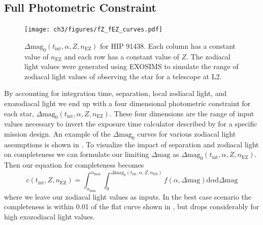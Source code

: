 
\subsection{Full Photometric Constraint}
\label{sub:full_comp}
\begin{figure}
  \begin{center}
    \texttt{[image: ch3/figures/fZ\_fEZ\_curves.pdf]}
  \end{center}
  \caption{$\Delta\textrm{mag}_0(t_\textrm{int}, \alpha, Z, n_\textrm{EZ})$ for HIP 91438.
    Each column has a constant value of $n_\textrm{EZ}$ and each row has a
    constant value of $Z$. The zodiacal light values were generated
    using EXOSIMS to simulate the range of zodiacal light values of observing
  the star for a telescope at L2.}
  \label{fig:fZ_fEZ_curves}
\end{figure}

By accounting for integration time, separation, local zodiacal light, and 
exozodiacal light we end up with a four dimensional photometric constraint for
each star, $\Delta\textrm{mag}_0(t_\textrm{int}, \alpha, Z,
n_\textrm{EZ})$. These four dimensions are the range of input values necessary
to invert the exposure time calculator described by \citet{Nemati2014} for a
specific mission design. An example of the $\Delta\textrm{mag}_0$ curves for
various zodiacal light assumptions is shown in . 
To visualize the impact of separation and zodiacal light on completeness
we can formulate our limiting $\Delta\textrm{mag}$ as 
$\Delta\textrm{mag}_0(t_\textrm{int}, \alpha, Z, n_\textrm{EZ})$.
Then our equation for completeness becomes
\begin{equation}
  c(t_\textrm{int}, Z, n_\textrm{EZ}) = 
  \int_{\alpha_\textrm{min}}^{\alpha_\textrm{max}} 
  \int_{0}^{\Delta\textrm{mag}_0(t_\textrm{int}, \alpha, Z, n_\textrm{EZ})}
  f(\alpha, \Delta\textrm{mag})\textrm{d}\alpha \textrm{d}\Delta\textrm{mag}
  \label{eq:comp_integral}
\end{equation}
where we leave our zodiacal light values as inputs. In the best case scenario
the completeness is within 0.01 of the flat curve shown in
, but drops considerably for high exozodiacal
light values.

